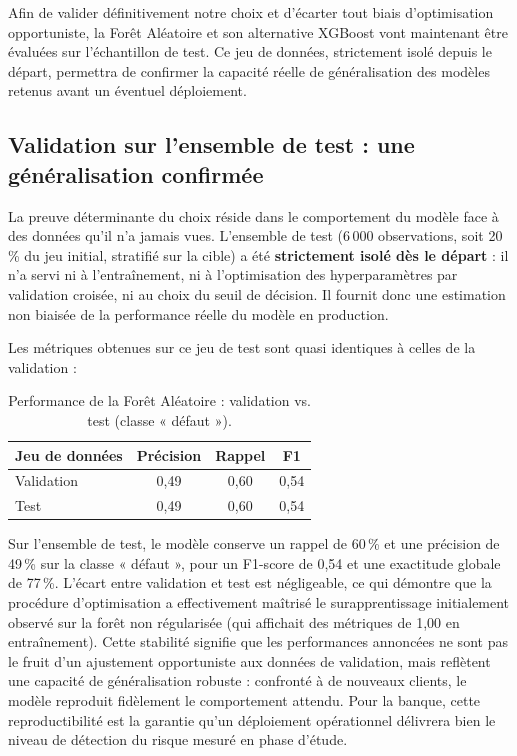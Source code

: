 \documentclass{article}
\begin{document}
Afin de valider définitivement notre choix et d'écarter tout biais d'optimisation opportuniste, la Forêt Aléatoire et son alternative XGBoost vont maintenant être évaluées sur l'échantillon de test. Ce jeu de données, strictement isolé depuis le départ, permettra de confirmer la capacité réelle de généralisation des modèles retenus avant un éventuel déploiement.


\subsection{Validation sur l'ensemble de test : une généralisation confirmée}

La preuve déterminante du choix réside dans le comportement du modèle face à des données qu'il n'a jamais vues. L'ensemble de test (6\,000 observations, soit 20\,\% du jeu initial, stratifié sur la cible) a été \textbf{strictement isolé dès le départ} : il n'a servi ni à l'entraînement, ni à l'optimisation des hyperparamètres par validation croisée, ni au choix du seuil de décision. Il fournit donc une estimation non biaisée de la performance réelle du modèle en production.

Les métriques obtenues sur ce jeu de test sont quasi identiques à celles de la validation :

\begin{table}[h]
\centering
\caption{Performance de la Forêt Aléatoire : validation vs. test (classe « défaut »).}
\label{tab:test}
\begin{tabular}{lccc}
\hline
\textbf{Jeu de données} & \textbf{Précision} & \textbf{Rappel} & \textbf{F1} \\
\hline
Validation & 0,49 & 0,60 & 0,54 \\
Test       & 0,49 & 0,60 & 0,54 \\
\hline
\end{tabular}
\end{table}

Sur l'ensemble de test, le modèle conserve un rappel de 60\,\% et une précision de 49\,\% sur la classe « défaut », pour un F1-score de 0,54 et une exactitude globale de 77\,\%. L'écart entre validation et test est négligeable, ce qui démontre que la procédure d'optimisation a effectivement maîtrisé le surapprentissage initialement observé sur la forêt non régularisée (qui affichait des métriques de 1,00 en entraînement). Cette stabilité signifie que les performances annoncées ne sont pas le fruit d'un ajustement opportuniste aux données de validation, mais reflètent une capacité de généralisation robuste : confronté à de nouveaux clients, le modèle reproduit fidèlement le comportement attendu. Pour la banque, cette reproductibilité est la garantie qu'un déploiement opérationnel délivrera bien le niveau de détection du risque mesuré en phase d'étude.
\end{document}
